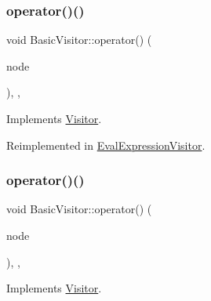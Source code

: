 \subsubsection{\texorpdfstring{operator()()}{operator()()}\hspace{0.1cm}{\footnotesize\ttfamily [20/60]}}
{\footnotesize\ttfamily void Basic\+Visitor\+::operator() (\begin{DoxyParamCaption}\item[{const \hyperlink{struct_binary_expression}{Binary\+Expression} \&}]{node }\end{DoxyParamCaption})\hspace{0.3cm}{\ttfamily [inline]}, {\ttfamily [override]}, {\ttfamily [virtual]}}



Implements \hyperlink{struct_visitor_a6132b5969ec220e7c98af3a957f48a0e}{Visitor}.



Reimplemented in \hyperlink{struct_eval_expression_visitor_a2e82e15208fff6395063cba90be79e48}{Eval\+Expression\+Visitor}.

\mbox{\label{struct_basic_visitor_ab121f54f6337dc726745c65f47812d8d}} 
\subsubsection{\texorpdfstring{operator()()}{operator()()}\hspace{0.1cm}{\footnotesize\ttfamily [21/60]}}
{\footnotesize\ttfamily void Basic\+Visitor\+::operator() (\begin{DoxyParamCaption}\item[{const \hyperlink{struct_conditional_expression}{Conditional\+Expression} \&}]{node }\end{DoxyParamCaption})\hspace{0.3cm}{\ttfamily [inline]}, {\ttfamily [override]}, {\ttfamily [virtual]}}



Implements \hyperlink{struct_visitor_a132fc5e3ff45efb2869272fbe5d5f815}{Visitor}.

\mbox{\label{struct_basic_visitor_a8b5be95fdf83d05891a738923bace2be}} 
